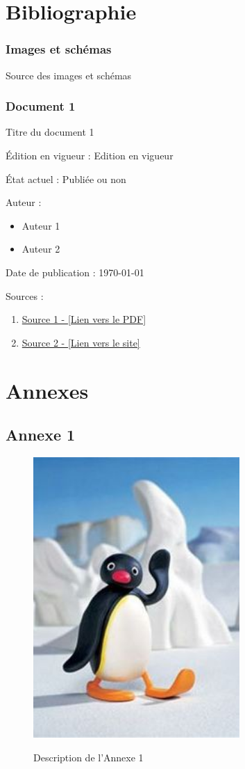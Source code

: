 \section*{Bibliographie}
\subsubsection{Images et schémas}\label{images}\label{shemas}
Source des images et schémas

\subsubsection{Document 1}\label{doc1}
Titre du document 1\par
Édition en vigueur : Edition en vigueur\par
État actuel : Publiée ou non\par
Auteur : 
\begin{itemize}
    \item Auteur 1
    \item Auteur 2
\end{itemize}\par
Date de publication : \today\par
Sources : 
\begin{enumerate}
    \item \href{https://www.youtube.com/watch?v=dQw4w9WgXcQ}{\textcolor{imtneCeleste}{Source 1 - [Lien vers le PDF]}}
    \item \href{https://www.youtube.com/watch?v=dQw4w9WgXcQ}{\textcolor{imtneCeleste}{Source 2 - [Lien vers le site]}}
\end{enumerate}

\newpage
\section*{Annexes}
\subsection*{Annexe 1}
\begin{figure}[ht!]
    \centering
    \includegraphics[width=0.7\textwidth]{paper/figures/pingu.jpg}
    \label{pingu}
    \caption{Description de l'Annexe 1}
\end{figure}
